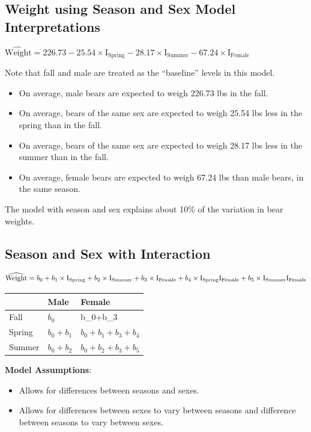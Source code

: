 \documentclass[]{book}
\providecommand{\tightlist}{%
  \setlength{\itemsep}{0pt}\setlength{\parskip}{0pt}}
\begin{document}
\subsection{Weight using Season and Sex Model
Interpretations}\label{weight-using-season-and-sex-model-interpretations}

\(\widehat{\text{Weight}} = 226.73-25.54 \times\text{I}_{\text{Spring}}-28.17\times\text{I}_{\text{Summer}} -67.24\times\text{I}_{\text{Female}}\)

Note that fall and male are treated as the ``baseline'' levels in this
model.

\begin{itemize}
\item
  On average, male bears are expected to weigh 226.73 lbs in the fall.
\item
  On average, bears of the same sex are expected to weigh 25.54 lbs less
  in the spring than in the fall.
\item
  On average, bears of the same sex are expected to weigh 28.17 lbs less
  in the summer than in the fall.
\item
  On average, female bears are expected to weigh 67.24 lbs than male
  bears, in the same season.
\end{itemize}

The model with season and sex explains about 10\% of the variation in
bear weights.

\subsection{Season and Sex with
Interaction}\label{season-and-sex-with-interaction}

\[\widehat{\text{Weight}} = b_0 + b_1 \times\text{I}_{\text{Spring}} + b_2\times\text{I}_{\text{Summer}} +b_3\times\text{I}_{\text{Female}}\\ +b_4\times\text{I}_{\text{Spring}}\text{I}_{\text{Female}} +b_5\times\text{I}_{\text{Summer}}\text{I}_{\text{Female}}\]

\begin{longtable}[]{@{}lll@{}}
\toprule
& Male & Female\tabularnewline
\midrule
\endhead
Fall & \(b_0\) & b\_0+b\_3\tabularnewline
Spring & \(b_0+b_1\) & \(b_0+b_1 +b_3+b_4\)\tabularnewline
Summer & \(b_0+b_2\) & \(b_0+b_2+b_3+b_5\)\tabularnewline
\bottomrule
\end{longtable}

\textbf{Model Assumptions}:

\begin{itemize}
\tightlist
\item
  Allows for differences between seasons and sexes.\\
\item
  Allows for differences between sexes to vary between seasons and
  difference between seasons to vary between sexes.
\end{itemize}
\end{document}
